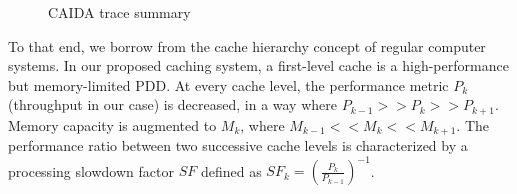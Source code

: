 \begin{figure}[]
	\begin{adjustwidth}{-0.6cm}{}
		\centering
		\caption{CAIDA trace summary}
		\label{fig:traces}
	\end{adjustwidth}
\end{figure}


To that end, we borrow from the cache hierarchy concept of regular computer systems.
In our proposed caching system, a first-level cache is a high-performance but memory-limited PDD.
At every cache level, the performance metric $P_{k}$ (throughput in our case) is decreased, in a way where $P_{k-1} >> P_{k} >> P_{k+1}$.
Memory capacity is augmented to $M_{k}$, where $M_{k-1} << M_{k} << M_{k+1}$. 
The performance ratio between two successive cache levels is characterized by a processing slowdown factor $SF$ defined as $SF_{k} = \left(\frac{P_{k}}{P_{k-1}}\right)^{-1}$.


